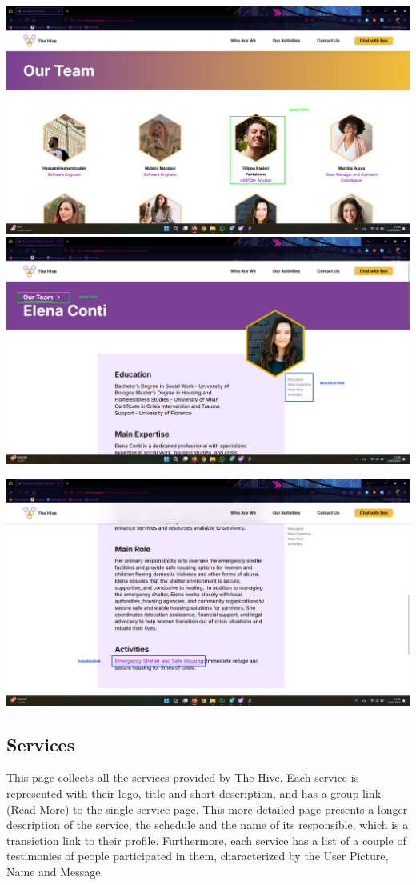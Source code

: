 \vspace{1em}
\includegraphics[width=0.5\linewidth]{img/design-document/website-screenshots/teampage.png}
\includegraphics[width=0.5\linewidth]{img/design-document/website-screenshots/personpage-1.png}
\begin{center}
    \includegraphics[width=0.5\linewidth]{img/design-document/website-screenshots/personpage-2.png}
\end{center}

\subsection{Services}
This page collects all the services provided by The Hive. Each service is represented with their logo, title and short description,
and has a group link (Read More) to the single service page. This more detailed page presents a longer description of the service, the schedule and
the name of its responsible, which is a transiction link to their profile. Furthermore, each service has a list of a couple of testimonies of people
participated in them, characterized by the User Picture, Name and Message.

